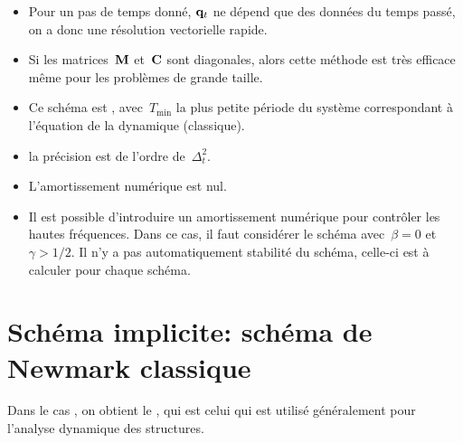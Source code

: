 \begin{itemize}
  \item Pour un pas de temps donné, $\VV{q}_t$ ne dépend que des données du temps passé,
	on a donc une résolution vectorielle rapide.
  \item Si les matrices~$\MM{M}$ et~$\MM{C}$ sont diagonales, alors cette méthode est 
   très efficace même pour les problèmes de grande taille.
  \item Ce schéma est , avec~$T_{\min}$ la plus petite période du système
   correspondant à l'équation de la dynamique (classique).
  \item la précision est de l'ordre de~$\Delta_t^2$.
  \item L'amortissement numérique est nul.
  \item Il est possible d'introduire un amortissement numérique pour contrôler les hautes
	fréquences. Dans ce cas, il faut considérer le schéma avec~$\beta=0$ et~$\gamma>1/2$.
	Il n'y a pas automatiquement stabilité du schéma, celle-ci est à calculer pour chaque
	schéma.
\end{itemize}

\medskip
\section{Schéma implicite: schéma de Newmark classique}

Dans le cas , on obtient le , qui est celui qui est utilisé généralement pour l'analyse dynamique des structures.

